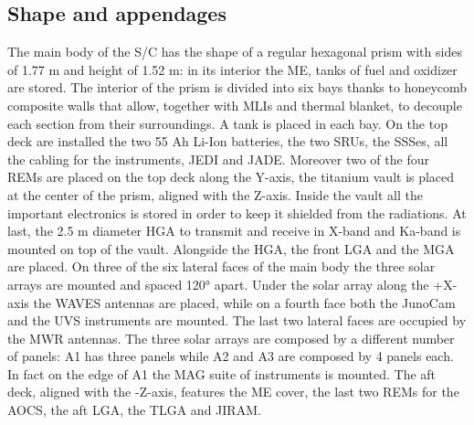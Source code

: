 \subsection{Shape and appendages}
\label{subsec:shape_appendages}


The main body of the S/C has the shape of a regular hexagonal prism with sides of 1.77 m and height of 1.52 m: in its interior the ME, tanks of fuel and oxidizer are stored.
The interior of the prism is divided into six bays thanks to honeycomb composite walls that allow, together with MLIs and thermal blanket, to decouple each section from their surroundings.
A tank is placed in each bay. On the top deck are installed the two 55 Ah Li-Ion batteries, the two SRUs, the SSSes, all the cabling for the instruments, JEDI and JADE.
Moreover two of the four REMs are placed on the top deck along the Y-axis, the titanium vault is placed at the center of the prism, aligned with the Z-axis.
Inside the vault all the important electronics is stored in order to keep it shielded from the radiations. At last, the 2.5 m diameter HGA to transmit and receive in X-band and Ka-band is mounted on top of the vault.
Alongside the HGA, the front LGA and the MGA are placed. On three of the six lateral faces of the main body the three solar arrays are mounted and spaced 120° apart.
Under the solar array along the +X-axis the WAVES antennas are placed, while on a fourth face both the JunoCam and the UVS instruments are mounted. The last two lateral faces are occupied by the MWR antennas.
The three solar arrays are composed by a different number of panels: A1 has three panels while A2 and A3 are composed by 4 panels each.
In fact on the edge of A1 the MAG suite of instruments is mounted. The aft deck, aligned with the -Z-axis, features the ME cover, the last two REMs for the AOCS, the aft LGA, the TLGA and JIRAM.